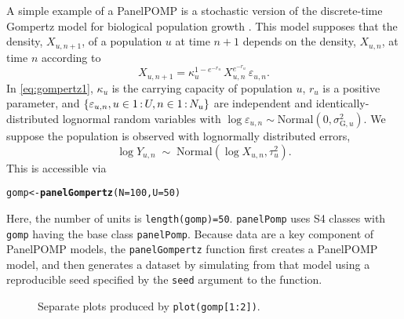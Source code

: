 \documentclass[12pt]{article}\usepackage[]{graphicx}\usepackage[table]{xcolor}
\makeatletter
\newcommand{\hlnum}[1]{\textcolor[rgb]{0.686,0.059,0.569}{#1}}%
\newcommand{\hldef}[1]{\textcolor[rgb]{0.345,0.345,0.345}{#1}}%
\newcommand{\hlkwb}[1]{\textcolor[rgb]{0.69,0.353,0.396}{#1}}%
\newcommand{\hlkwc}[1]{\textcolor[rgb]{0.333,0.667,0.333}{#1}}%
\newcommand{\hlkwd}[1]{\textcolor[rgb]{0.737,0.353,0.396}{\textbf{#1}}}%
\newenvironment{kframe}{%
 \def\at@end@of@kframe{}%
 \ifinner\ifhmode%
  \def\at@end@of@kframe{\end{minipage}}%
  \begin{minipage}{\columnwidth}%
 \fi\fi%
 \def\FrameCommand##1{\hskip\@totalleftmargin \hskip-\fboxsep
 \colorbox{shadecolor}{##1}\hskip-\fboxsep
     \hskip-\linewidth \hskip-\@totalleftmargin \hskip\columnwidth}%
 \MakeFramed {\advance\hsize-\width
   \@totalleftmargin\z@ \linewidth\hsize
   \@setminipage}}%
 {\par\unskip\endMakeFramed%
 \at@end@of@kframe}
\newenvironment{knitrout}{}{} %
\newcommand\code{\texttt}
\newcommand\panelPomp{\texttt{panelPomp}\xspace}
\newcommand\PanelPOMP{PanelPOMP}
\newcommand\mycolon{{\hspace{0.6mm}:\hspace{0.6mm}}}
\newcommand\unit{u} %
\newcommand\Unit{U} %
\newcommand\normal{\mathrm{Normal}}
\makeatother
\begin{document}
A simple example of a {\PanelPOMP} is a stochastic version of the discrete-time Gompertz model for biological population growth \citep{winsor32}.
This model supposes that the density, $X_{\unit,n+1}$, of a population $\unit$ at time $n+1$ depends on the density, $X_{\unit,n}$, at time $n$ according to
\begin{equation}
\label{eq:gompertz1}
X_{\unit,n+1}=\kappa_\unit^{1-e^{-r_\unit}}\,X_{\unit,n}^{e^{-r_\unit}}\,\varepsilon_{\unit,n}.
\end{equation}
In \eqref{eq:gompertz1}, $\kappa_\unit$ is the carrying capacity of population $\unit$, $r_\unit$ is a positive parameter, and $\{\varepsilon_{\unit,n},\unit\in 1\mycolon\Unit,n\in 1\mycolon N_\unit\}$ are independent and identically-distributed lognormal random variables with $\log\varepsilon_{\unit,n}\sim\normal(0,\sigma_{\mathrm{G},\unit}^2)$.
We suppose the population is observed with lognormally distributed errors,
\begin{equation}
\label{eq:gompertz-obs}
\nonumber
\log{Y_{\unit,n}}\;\sim\;\normal\left(\log{X_{\unit,n}},\tau_\unit^2\right).
\end{equation}
This is accessible via
\begin{knitrout}
\color{fgcolor}\begin{kframe}
\begin{alltt}
\hldef{gomp} \hlkwb{<-} \hlkwd{panelGompertz}\hldef{(}\hlkwc{N} \hldef{=} \hlnum{100}\hldef{,} \hlkwc{U} \hldef{=} \hlnum{50}\hldef{)}
\end{alltt}
\end{kframe}
\end{knitrout}
\noindent Here, the number of units is \code{length(gomp)=50}.
\panelPomp uses S4 classes \citep{chambers98,genolini08} with \code{gomp} having the base class \code{panelPomp}.
Because data are a key component of PanelPOMP models, the \code{panelGompertz} function first creates a PanelPOMP model, and then generates a dataset by simulating from that model using a reproducible seed specified by the \code{seed} argument to the function.



\begin{figure}
\begin{center}
\caption{Separate plots produced by \code{plot(gomp[1:2])}.}
\label{fig-plot-gomp}
\end{center}
\end{figure}
\end{document}
